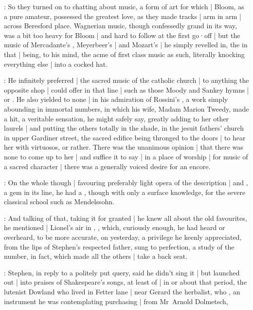 :
So they turned on to chatting about music,
a form of art for which |
Bloom,
as a pure amateur,
possessed the greatest love,
as they made tracks |
arm in arm |
across Beresford place.
Wagnerian music,
though confessedly grand in its way,
was a bit too heavy for Bloom |
and hard to follow at the first go·off |
but the music of Mercadante's ,
Meyerbeer's  |
and Mozart's  |
he simply revelled in,
the  in that |
being,
to his mind,
the acme of first class music as such,
literally knocking everything else |
into a cocked hat.%

:
He infinitely preferred |
the sacred music of the catholic church |
to anything the opposite shop |
could offer in that line |
such as those Moody and Sankey hymns |
or .
He also yielded to none |
in his admiration of Rossini's ,
a work simply abounding in immortal numbers,
in which his wife,
Madam Marion Tweedy,
made a hit,
a veritable sensation,
he might safely say,
greatly adding to her other laurels |
and putting the others totally in the shade,
in the jesuit fathers' church in upper Gardiner street,
the sacred edifice being thronged to the doors |
to hear her with virtuosos,
or  rather.
There was the unanimous opinion |
that there was none to come up to her |
and suffice it to say |
in a place of worship |
for music of a sacred character |
there was a generally voiced desire for an encore.

:
On the whole though |
favouring preferably light opera of the  description |
and ,
a gem in its line,
he had a ,
though with only a surface knowledge,
for the severe classical school such as Mendelssohn.

:
And talking of that,
taking it for granted |
he knew all about the old favourites,
he mentioned  |
Lionel's air in ,
,
which,
curiously enough,
he had heard or overheard,
to be more accurate,
on yesterday,
a privilege he keenly appreciated,
from the lips of Stephen's respected father,
sung to perfection,
a study of the number,
in fact,
which made all the others |
take a back seat.%

:
Stephen,
in reply to a politely put query,
said he didn't sing it |
but launched out |
into praises of Shakespeare's songs,
at least of |
in or about that period,
the lutenist Dowland who lived in Fetter lane |
near Gerard the herbalist,
who ,
an instrument he was contemplating purchasing |
from Mr~Arnold Dolmetsch,

